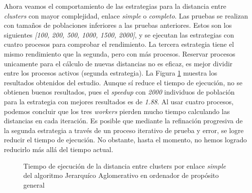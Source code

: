 		Ahora veamos el comportamiento de las estrategias para la distancia entre \textit{clusters} con mayor complejidad, enlace \textit{simple} o \textit{completo}. Las pruebas se realizan con tamaños de poblaciones inferiores a las pruebas anteriores. Estos son los siguientes \textit{[100, 200, 500, 1000, 1500, 2000]}, y se ejecutan las estrategias con cuatro procesos para comprobar el rendimiento. La tercera estrategia tiene el mismo rendimiento que la segunda, pero con más procesos. Reservar procesos unicamente para el cálculo de nuevas distancias no es eficaz, es mejor dividir entre los procesos activos (segunda estrategia). La Figura \ref{fig:JA_simple} muestra los resultados obtenidos del estudio. Aunque sí reduce el tiempo de ejecución, no se obtienen buenos resultados, pues el \textit{speedup} con \textit{2000} individuos de población para la estrategia con mejores resultados es de \textit{1.88}. Al usar cuatro procesos, podemos concluir que los tres \textit{workers} pierden mucho tiempo calculando las distancias en cada iteración. Es posible que mediante la refinación progresiva de la segunda estrategia a través de un proceso iterativo de prueba y error, se logre reducir el tiempo de ejecución. No obstante, hasta el momento, no hemos logrado reducirlo más allá del tiempo actual.
		
			\begin{figure}[!h]
				\hspace{-0.10\textwidth}
				\caption{Tiempo de ejecución de la distancia entre clusters por enlace \textit{simple} del algoritmo Jerarquíco Aglomerativo en ordenador de propósito general}
				\label{fig:JA_simple}
			\end{figure}
				
